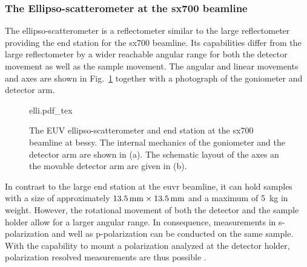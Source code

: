 \subsubsection{The Ellipso-scatterometer at the \gls{sx700} beamline}
The ellipso-scatterometer is a reflectometer similar to the large reflectometer providing the end station for the \gls{sx700} beamline. Its capabilities differ from the large reflectometer by a wider reachable angular range for both the detector movement as well as the sample movement. The angular and linear movements and axes are shown in Fig.~\ref{ch_exp:fig_elli} together with a photograph of the goniometer and detector arm.
\begin{figure}[htb]
    \def\svgwidth{\textwidth}
    {elli.pdf_tex}
    \caption[The EUV ellipso-scatterometer.]{The EUV ellipso-scatterometer and end station at the \gls{sx700} beamline at \gls{bessy}. The internal mechanics of the goniometer and the detector arm are shown in (a). The schematic layout of the axes an the movable detector arm are given in (b).}
    \label{ch_exp:fig_elli}
\end{figure}
In contrast to the large end station at the \gls{euvr} beamline, it can hold samples with a size of approximately $\mm{13.5} \times \mm{13.5}$ and a maximum of \SI{5}{\kg} in weight. However, the rotational movement of both the detector and the sample holder allow for a larger angular range. In consequence, measurements in s-polarization and well as p-polarization can be conducted on the same sample. With the capability to mount a polarization analyzed at the detector holder, polarization resolved measurements are thus possible \cite{soltwisch_polarization_2015}.

